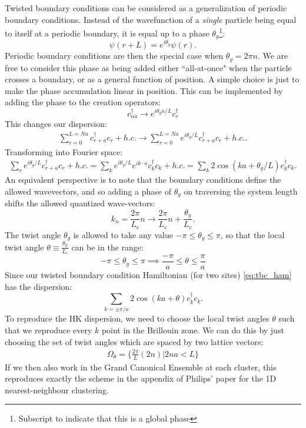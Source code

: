 \documentclass[12pt]{article}
\numberwithin{equation}{section}
\begin{document}
Twisted boundary conditions can be considered as a generalization of periodic boundary conditions. Instead of the wavefunction of a \textit{single} particle being equal to itself at a periodic boundary, it is equal up to a phase $\theta_g$\footnote{Subscript to indicate that this is a global phase}:
\begin{equation}
    \psi(r+L)=e^{i\theta_g}\psi(r).
\end{equation}
Periodic boundary conditions are then the special case when $\theta_g=2\pi n$. We are free to consider this phase as being added either ``all-at-once" when the particle crosses a boundary, or as a general function of position. A simple choice is just to make the phase accumulation linear in position. This can be implemented by adding the phase to the creation operators:
\begin{equation}
    c^\dagger_{n a}\to e^{i\theta_g n /L}c^\dagger_{r}
\end{equation}
This changes our dispersion:
\begin{align}
    \sum_{r=0}^{L=Na}c^\dagger_{r+a}c_r+h.c.\to \sum_{r=0}^{L=Na}e^{i\theta_g/L}c^\dagger_{r+a}c_{r}+h.c. .
\end{align}
Transforming into Fourier space:
\begin{align}
    \label{eq:tbc_ham}
    \sum_{r}e^{i\theta_g/L}c^\dagger_{r+a}c_{r}+h.c.
    =\sum_{k}e^{i\theta_g/L}e^{ik\cdot a}c^\dagger_{k}c_{k}+h.c.
    =\sum_{k}2\cos(ka+\theta_g/L)c^\dagger_kc_k .
\end{align}
An equivalent perspective is to note that the boundary conditions define the allowed wavevectors, and so adding a phase of $\theta_g$ on traversing the system length shifts the allowed quantized wave-vectors:
\begin{equation}
    k_n=\frac{2\pi}{L_c}n\to\frac{2\pi}{L_c}n+\frac{\theta_g}{L_c}.
\end{equation}
The twist angle $\theta_g$ is allowed to take any value $-\pi\leq\theta_g\leq\pi$, so that the local twist angle $\theta\equiv\frac{\theta_g}{L_c}$ can be in the range:
\begin{equation}
    -\pi\leq\theta_g\leq\pi\implies \frac{-\pi}{a}\leq\theta \leq\frac{\pi}{a}
\end{equation}
Since our twisted boundary condition Hamiltonian (for two sites) \cref{eq:tbc_ham} has the dispersion:
\begin{equation}
    \sum_{k=\pm\pi/a}2\cos(ka+\theta)c^\dagger_kc_k.
\end{equation}
To reproduce the HK dispersion, we need to choose the local twist angles $\theta$ such that we reproduce every $k$ point in the Brillouin zone. We can do this by just choosing the set of twist angles which are spaced by two lattice vectors:
\begin{align}
    \Omega_\theta=\bigg\{\frac{2\pi}{L}(2n)\bigg| 2n a < L\bigg\}
\end{align}
If we then also work in the Grand Canonical Ensemble at each cluster, this reproduces exactly the scheme in the appendix of Philips' paper for the 1D nearest-neighbour clustering.
\end{document}
